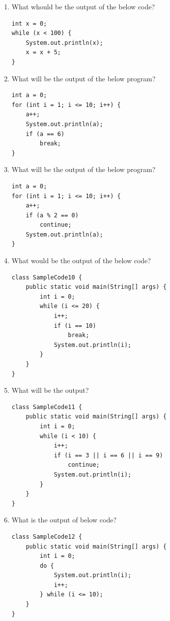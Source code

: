 \documentclass[11pt,a4paper]{article}
\def\AnswerBox{\fbox{\begin{minipage}{4in}\hfill\vspace{0.5in}\end{minipage}}}
\begin{document}
\begin{enumerate}
\item What whould be the output of the below code?
\begin{lstlisting}
int x = 0;
while (x < 100) {
    System.out.println(x);
    x = x + 5;
}
\end{lstlisting}

\AnswerBox

\item What will be the output of the below program?  
\begin{lstlisting} 
int a = 0;
for (int i = 1; i <= 10; i++) {
    a++;
    System.out.println(a);
    if (a == 6)
        break;
}
\end{lstlisting}
\AnswerBox

\item What will be the output of the below program?  
\begin{lstlisting} 
int a = 0;
for (int i = 1; i <= 10; i++) {
    a++;
    if (a % 2 == 0)
        continue;
    System.out.println(a);
}   
\end{lstlisting}
\AnswerBox

\item What would be the output of the below code?
\begin{lstlisting} 
class SampleCode10 {
    public static void main(String[] args) {
        int i = 0;
        while (i <= 20) {
            i++;
            if (i == 10)
                break;
            System.out.println(i);
        }
    }
}
\end{lstlisting}

\AnswerBox

\item What will be the output?
\begin{lstlisting}
class SampleCode11 {
    public static void main(String[] args) {
        int i = 0;
        while (i < 10) {
            i++;
            if (i == 3 || i == 6 || i == 9) 
                continue;
            System.out.println(i);
        }
    }
}
\end{lstlisting}

\AnswerBox

\item What is the output of below code?
\begin{lstlisting}
class SampleCode12 {
    public static void main(String[] args) {
        int i = 0;
        do {
            System.out.println(i);
            i++;
        } while (i <= 10);
    }
}
\end{lstlisting}
\AnswerBox


\end{enumerate}
\end{document}
